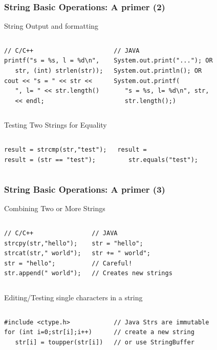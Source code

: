 \documentclass{beamer}
\begin{document}
\begin{frame}[fragile]
  \frametitle{String Basic Operations: A primer (2)}
  {\smaller
    \begin{block}{String Output and formatting}
      \begin{columns}[T]
\begin{verbatim}
// C/C++
printf("s = %s, l = %d\n",
   str, (int) strlen(str));
cout << "s = " << str << 
   ", l= " << str.length() 
   << endl;
\end{verbatim}
\begin{verbatim}
// JAVA
System.out.print("..."); OR
System.out.println(); OR
System.out.printf(
   "s = %s, l= %d\n", str, 
   str.length();)
\end{verbatim}
      \end{columns}
    \end{block}
    \begin{block}{Testing Two Strings for Equality}
      \begin{columns}[T]
\begin{verbatim}
result = strcmp(str,"test");
result = (str == "test");
\end{verbatim}
\begin{verbatim}
result = 
   str.equals("test");

\end{verbatim}
      \end{columns}
    \end{block}
  }
\end{frame}

\begin{frame}[fragile]
  \frametitle{String Basic Operations: A primer (3)}
  {\smaller
    \begin{block}{Combining Two or More Strings}
      \begin{columns}[T]
\begin{verbatim}
// C/C++
strcpy(str,"hello");
strcat(str," world");
str = "hello";
str.append(" world");
\end{verbatim}
\begin{verbatim}
// JAVA
str = "hello";
str += " world"; 
// Careful! 
// Creates new strings
\end{verbatim}
      \end{columns}
    \end{block}
    \begin{block}{Editing/Testing single characters in a string}
      \begin{columns}[T]
\begin{verbatim}
#include <ctype.h>
for (int i=0;str[i];i++)
   str[i] = toupper(str[i])
\end{verbatim}
\begin{verbatim}
// Java Strs are immutable
// create a new string
// or use StringBuffer
\end{verbatim}
      \end{columns}
    \end{block}
  }
\end{frame}
\end{document}
